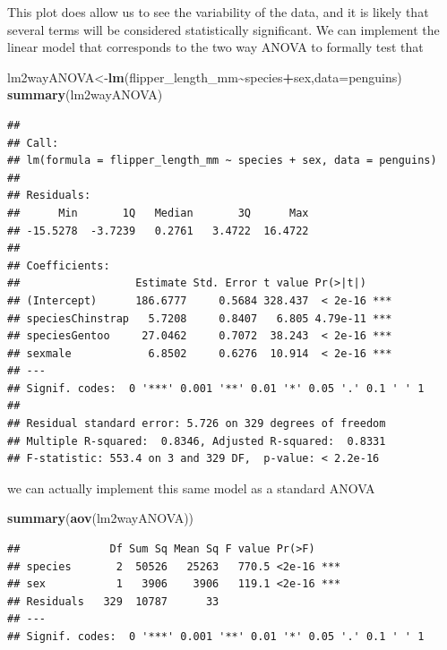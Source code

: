 \documentclass[
]{book}
\newenvironment{Shaded}{\begin{snugshade}}{\end{snugshade}}
\newcommand{\AttributeTok}[1]{\textcolor[rgb]{0.13,0.29,0.53}{#1}}
\newcommand{\FunctionTok}[1]{\textcolor[rgb]{0.13,0.29,0.53}{\textbf{#1}}}
\newcommand{\NormalTok}[1]{#1}
\newcommand{\OtherTok}[1]{\textcolor[rgb]{0.56,0.35,0.01}{#1}}
\newcommand{\SpecialCharTok}[1]{\textcolor[rgb]{0.81,0.36,0.00}{\textbf{#1}}}
\begin{document}
This plot does allow us to see the variability of the data, and it is likely that several terms will be considered statistically significant. We can implement the linear model that corresponds to the two way ANOVA to formally test that

\begin{Shaded}
\begin{Highlighting}[]
\NormalTok{lm2wayANOVA}\OtherTok{\textless{}{-}}\FunctionTok{lm}\NormalTok{(flipper\_length\_mm}\SpecialCharTok{\textasciitilde{}}\NormalTok{species}\SpecialCharTok{+}\NormalTok{sex,}\AttributeTok{data=}\NormalTok{penguins)}
\FunctionTok{summary}\NormalTok{(lm2wayANOVA)}
\end{Highlighting}
\end{Shaded}

\begin{verbatim}
## 
## Call:
## lm(formula = flipper_length_mm ~ species + sex, data = penguins)
## 
## Residuals:
##      Min       1Q   Median       3Q      Max 
## -15.5278  -3.7239   0.2761   3.4722  16.4722 
## 
## Coefficients:
##                  Estimate Std. Error t value Pr(>|t|)    
## (Intercept)      186.6777     0.5684 328.437  < 2e-16 ***
## speciesChinstrap   5.7208     0.8407   6.805 4.79e-11 ***
## speciesGentoo     27.0462     0.7072  38.243  < 2e-16 ***
## sexmale            6.8502     0.6276  10.914  < 2e-16 ***
## ---
## Signif. codes:  0 '***' 0.001 '**' 0.01 '*' 0.05 '.' 0.1 ' ' 1
## 
## Residual standard error: 5.726 on 329 degrees of freedom
## Multiple R-squared:  0.8346, Adjusted R-squared:  0.8331 
## F-statistic: 553.4 on 3 and 329 DF,  p-value: < 2.2e-16
\end{verbatim}

we can actually implement this same model as a standard ANOVA

\begin{Shaded}
\begin{Highlighting}[]
\FunctionTok{summary}\NormalTok{(}\FunctionTok{aov}\NormalTok{(lm2wayANOVA))}
\end{Highlighting}
\end{Shaded}

\begin{verbatim}
##              Df Sum Sq Mean Sq F value Pr(>F)    
## species       2  50526   25263   770.5 <2e-16 ***
## sex           1   3906    3906   119.1 <2e-16 ***
## Residuals   329  10787      33                   
## ---
## Signif. codes:  0 '***' 0.001 '**' 0.01 '*' 0.05 '.' 0.1 ' ' 1
\end{verbatim}
\end{document}
